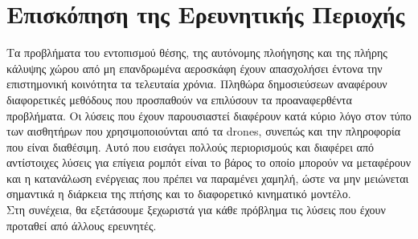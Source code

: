 \chapter{Επισκόπηση της Ερευνητικής Περιοχής}
\label{chapter:sota}

Τα προβλήματα του εντοπισμού θέσης, της αυτόνομης πλοήγησης και της πλήρης κάλυψης χώρου από μη επανδρωμένα αεροσκάφη έχουν απασχολήσει έντονα την επιστημονική κοινότητα τα τελευταία χρόνια. Πληθώρα δημοσιεύσεων αναφέρουν διαφορετικές μεθόδους που προσπαθούν να επιλύσουν τα προαναφερθέντα προβλήματα. Οι λύσεις που έχουν παρουσιαστεί διαφέρουν κατά κύριο λόγο στον τύπο των αισθητήρων που χρησιμοποιούνται από τα drones, συνεπώς και την πληροφορία που είναι διαθέσιμη. Αυτό που εισάγει πολλούς περιορισμούς και διαφέρει από αντίστοιχες λύσεις για επίγεια ρομπότ είναι το βάρος το οποίο μπορούν να μεταφέρουν και η κατανάλωση ενέργειας που πρέπει να παραμένει χαμηλή, ώστε να μην μειώνεται σημαντικά η διάρκεια της πτήσης και το διαφορετικό κινηματικό μοντέλο.\\ 

Στη συνέχεια, θα εξετάσουμε ξεχωριστά για κάθε πρόβλημα τις λύσεις που έχουν προταθεί από άλλους ερευνητές.



